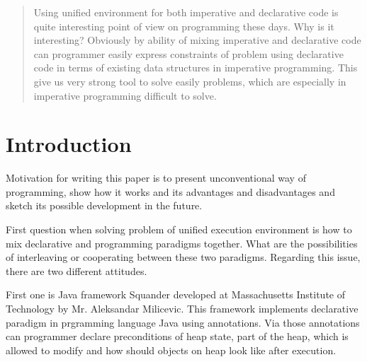 \documentclass[conference]{IEEEtran}
\begin{document}
\begin{abstract}
Using unified environment for both imperative and declarative code is quite
interesting point of view on programming these days. Why is it interesting?
Obviously by ability of mixing imperative and declarative code can programmer
easily express constraints of problem using declarative code in terms of
existing data structures in imperative programming. This give us very strong
tool to solve easily problems, which are especially in imperative programming
difficult to solve.
\end{abstract}





%
\IEEEpeerreviewmaketitle



\section{Introduction}
Motivation for writing this paper is to present unconventional way of
programming, show how it works and its advantages and disadvantages and
sketch its possible development in the future.

First question when solving problem of unified execution environment is how to
mix declarative and programming paradigms together. What are the possibilities
of interleaving or cooperating between these two paradigms. Regarding this
issue, there are two different attitudes.

First one is Java framework Squander developed at Massachusetts Institute of
Technology by Mr. Aleksandar Milicevic. This framework implements declarative
paradigm in prgramming language Java using annotations. Via those annotations
can programmer declare preconditions of heap state, part of the heap, which is
allowed to modify and how should objects on heap look like after execution.
\end{document}
